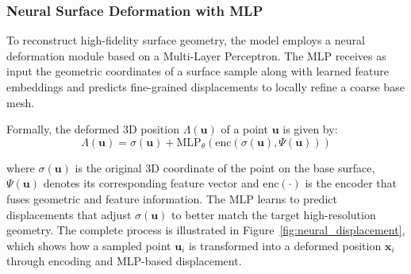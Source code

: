 \subsubsection{Neural Surface Deformation with MLP}

To reconstruct high-fidelity surface geometry, the model employs a neural deformation module based on a Multi-Layer Perceptron.  
The MLP receives as input the geometric coordinates of a surface sample along with learned feature embeddings and predicts fine-grained displacements to locally refine a coarse base mesh.

Formally, the deformed 3D position $\Lambda(\mathbf{u})$ of a point $\mathbf{u}$ is given by:
\begin{equation}
\Lambda(\mathbf{u}) = \sigma(\mathbf{u}) + \text{MLP}_\theta\left( \text{enc}(\sigma(\mathbf{u}), \Psi(\mathbf{u})) \right)
\end{equation}

where $\sigma(\mathbf{u})$ is the original 3D coordinate of the point on the base surface, $\Psi(\mathbf{u})$ denotes its corresponding feature vector and $\text{enc}(\cdot)$ is the encoder that fuses geometric and feature information.  
The MLP learns to predict displacements that adjust $\sigma(\mathbf{u})$ to better match the target high-resolution geometry.
The complete process is illustrated in Figure~\ref{fig:neural_displacement}, which shows how a sampled point $\mathbf{u}_i$ is transformed into a deformed position $\mathbf{x}_i$ through encoding and MLP-based displacement.

